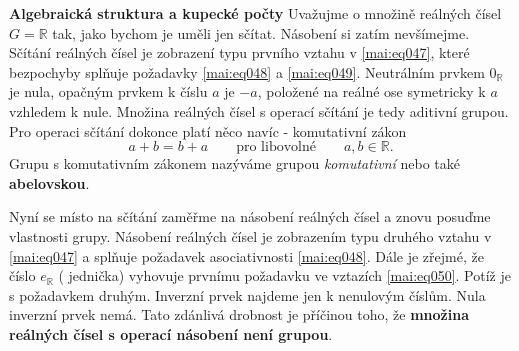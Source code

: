 \wikitextrule
\begin{example}\label{mai:exam047}
  \textbf{Algebraická struktura a kupecké počty}\newline\small
    Uvažujme o množině reálných čísel \(G = \mathbb{R}\) tak, jako bychom je uměli jen 
    sčítat. Násobení si zatím nevšímejme. Sčítání reálných čísel je zobrazení typu prvního 
    vztahu v \ref{mai:eq047}, které bezpochyby splňuje požadavky \ref{mai:eq048} a 
    \ref{mai:eq049}. Neutrálním prvkem \(0_{\mathbb{R}}\) je  nula, opačným prvkem k 
    číslu \(a\) je \(-a\), položené na reálné ose symetricky k \(a\) vzhledem k nule. Množina 
    reálných čísel s operací sčítání je tedy aditivní grupou. Pro operaci sčítání dokonce platí 
    něco navíc - komutativní zákon
    \begin{equation}\label{mai:eq051}
      a + b = b + a \qquad\text{pro libovolné}\qquad a,b\in\mathbb{R}.
    \end{equation} 
    Grupu s komutativním zákonem nazýváme grupou \emph{komutativní} nebo také \textbf{abelovskou}.
    
    
    Nyní se místo na sčítání zaměřme na násobení reálných čísel a znovu posuďme vlastnosti grupy. 
    Násobení reálných čísel je zobrazením typu druhého vztahu v \ref{mai:eq047} a splňuje požadavek 
    asociativnosti \ref{mai:eq048}. Dále je zřejmé, že číslo \(e_{\mathbb{R}}\) ( 
    jednička) vyhovuje prvnímu požadavku ve vztazích \ref{mai:eq050}. Potíž je s požadavkem druhým. 
    Inverzní prvek najdeme jen k nenulovým číslům. Nula inverzní prvek nemá. Tato zdánlivá drobnost 
    je příčinou toho, že \textbf{množina reálných čísel s operací násobení není grupou}.
  \normalsize
\end{example}